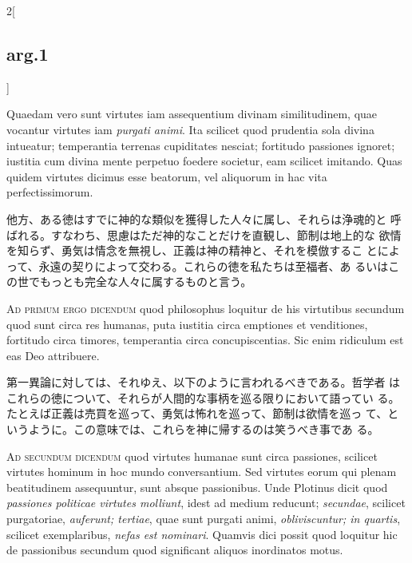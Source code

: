 \documentclass[paper=a4paper,fontsize=10pt,jafontsize=9pt,titlepage]{jlreq}
\begin{document}
\begin{paracol}{2}[\subsection{arg.1}]
\switchcolumn*

Quaedam vero sunt virtutes iam assequentium divinam similitudinem,
 quae vocantur virtutes iam {\itshape purgati animi}. Ita scilicet
 quod prudentia sola divina intueatur; temperantia terrenas
 cupiditates nesciat; fortitudo passiones ignoret; iustitia cum divina
 mente perpetuo foedere societur, eam scilicet imitando. Quas quidem
 virtutes dicimus esse beatorum, vel aliquorum in hac vita
 perfectissimorum.

\switchcolumn

他方、ある徳はすでに神的な類似を獲得した人々に属し、それらは浄魂的と
 呼ばれる。すなわち、思慮はただ神的なことだけを直観し、節制は地上的な
 欲情を知らず、勇気は情念を無視し、正義は神の精神と、それを模倣するこ
 とによって、永遠の契りによって交わる。これらの徳を私たちは至福者、あ
 るいはこの世でもっとも完全な人々に属するものと言う。

\switchcolumn*[\subsection{ad.1}]

{\scshape Ad primum ergo dicendum} quod philosophus loquitur de his
virtutibus secundum quod sunt circa res humanas, puta iustitia circa
emptiones et venditiones, fortitudo circa timores, temperantia circa
concupiscentias. Sic enim ridiculum est eas Deo attribuere.

\switchcolumn

第一異論に対しては、それゆえ、以下のように言われるべきである。哲学者
 はこれらの徳について、それらが人間的な事柄を巡る限りにおいて語ってい
 る。たとえば正義は売買を巡って、勇気は怖れを巡って、節制は欲情を巡っ
 て、というように。この意味では、これらを神に帰するのは笑うべき事であ
 る。

\switchcolumn*[\subsection{ad.2}]

{\scshape Ad secundum dicendum} quod virtutes humanae sunt circa
passiones, scilicet virtutes hominum in hoc mundo conversantium. Sed
virtutes eorum qui plenam beatitudinem assequuntur, sunt absque
passionibus. Unde Plotinus dicit quod {\itshape passiones politicae
virtutes molliunt}, idest ad medium reducunt; {\itshape secundae},
scilicet purgatoriae, {\itshape auferunt; tertiae}, quae sunt purgati
animi, {\itshape obliviscuntur; in quartis}, scilicet exemplaribus,
{\itshape nefas est nominari}. Quamvis dici possit quod loquitur hic
de passionibus secundum quod significant aliquos inordinatos motus.


\end{paracol}
\end{document}
